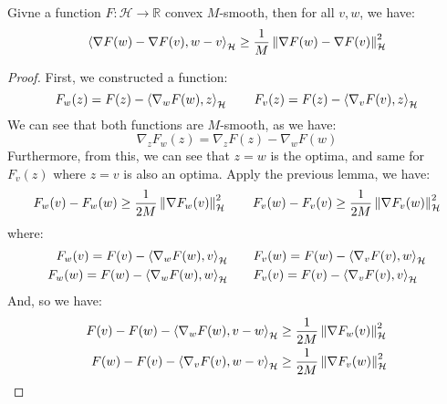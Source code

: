 \begin{proposition}
    Givne a function $F:\mathcal{H} \rightarrow \mathbb{R}$ convex $M$-smooth, then for all $v, w$, we have:
    \begin{equation*}
        \left\langle \nabla F(w) - \nabla F(v),w-v  \right\rangle_\mathcal{H} \ge \frac{1}{M}\left\lVert\nabla F(w) - \nabla F(v)\right\rVert^2_\mathcal{H}
    \end{equation*}
\end{proposition}

\begin{proof}
    First, we constructed a function:
    \begin{equation*}
        F_w(z) = F(z) - \left\langle \nabla_w F(w), z \right\rangle_\mathcal{H} \qquad 
        F_v(z) = F(z) - \left\langle \nabla_v F(v), z \right\rangle_\mathcal{H} 
    \end{equation*}
    We can see that both functions are $M$-smooth, as we have:
    \begin{equation*}
        \nabla_z F_w(z) = \nabla_z F(z) - \nabla_w F(w)
    \end{equation*}
    Furthermore, from this, we can see that $z = w$ is the optima, and same for $F_v(z)$ where $z = v$ is also an optima. Apply the previous lemma, we have:
    \begin{equation*}
        F_w(v) - F_w(w) \ge \frac{1}{2M}\left\lVert\nabla F_w(v)\right\rVert^2_\mathcal{H}
        \qquad F_v(w) - F_v(v) \ge \frac{1}{2M}\left\lVert\nabla F_v(w)\right\rVert^2_\mathcal{H}
    \end{equation*}
    where:
    \begin{equation*}
    \begin{aligned}
        F_w(v) = F(v) - \left\langle \nabla_w F(w), v \right\rangle_\mathcal{H} 
        &\qquad F_v(w) = F(w) - \left\langle \nabla_v F(v), w \right\rangle_\mathcal{H} \\
        F_w(w) = F(w) - \left\langle \nabla_w F(w), w \right\rangle_\mathcal{H} 
        &\qquad F_v(v) = F(v) - \left\langle \nabla_v F(v), v \right\rangle_\mathcal{H} \\ 
    \end{aligned}
    \end{equation*}
    And, so we have:
    \begin{equation*}
    \begin{aligned}
        F(v) - F(w) - \brackd{\nabla_w F(w), v - w}_\mathcal{H} &\ge \frac{1}{2M}\norm{\nabla F_w(v)}^2_\mathcal{H} \\
        F(w) - F(v) - \brackd{\nabla_v F(v), w - v}_\mathcal{H} &\ge \frac{1}{2M}\norm{\nabla F_v(w)}^2_\mathcal{H}
    \end{aligned}

\end{equation*}
\end{proof}
